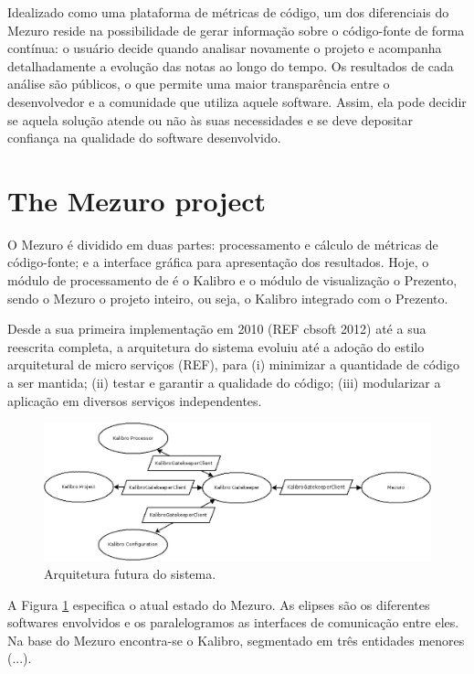 \documentclass{llncs}
\begin{document}
Idealizado como uma plataforma de métricas de código, um dos diferenciais do
Mezuro reside na possibilidade de gerar informação sobre o código-fonte de
forma contínua: o usuário decide quando analisar novamente o projeto e
acompanha detalhadamente a evolução das notas ao longo do tempo. Os resultados
de cada análise são públicos, o que permite uma maior transparência entre o
desenvolvedor e a comunidade que utiliza aquele software. Assim, ela
pode decidir se aquela solução atende ou não às suas necessidades e se deve
depositar confiança na qualidade do software desenvolvido.

\section{The Mezuro project}
\label{sec:mezuro}

O Mezuro é dividido em duas partes: processamento e cálculo de métricas de
código-fonte; e a interface gráfica para apresentação dos resultados. Hoje, o
módulo de processamento de é o Kalibro e o módulo de visualização o Prezento,
sendo o Mezuro o projeto inteiro, ou seja, o Kalibro integrado com o Prezento.

Desde a sua primeira implementação em 2010 (REF cbsoft 2012) até a sua
reescrita completa, a arquitetura do sistema evoluiu até a adoção do estilo
arquitetural de micro serviços (REF), para  (i) minimizar a quantidade de
código a ser mantida; (ii) testar e garantir a qualidade do código; (iii)
modularizar a aplicação em diversos serviços independentes.

\begin{figure}[H]
  \centering
    \includegraphics[width=\textwidth]{images/mezuro-architecture-predicted.png}
  \caption{Arquitetura futura do sistema.}
  \label{fig:architecture-2}
\end{figure}


A Figura \ref{fig:architecture-2} especifica o atual estado do Mezuro. As
elipses são os diferentes softwares envolvidos e os paralelogramos as
interfaces de comunicação entre eles. Na base do Mezuro encontra-se o Kalibro,
segmentado em três entidades menores (...).
\end{document}

